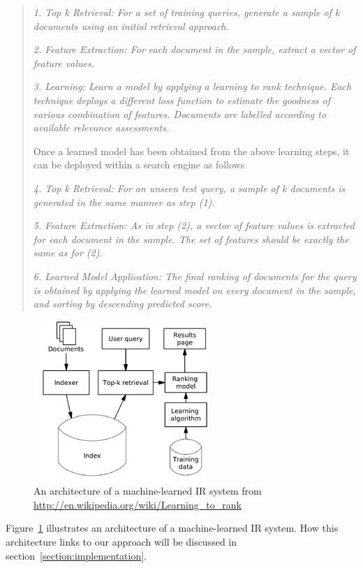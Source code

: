 \begin{quote}
  \item \textit{1. Top k Retrieval: For a set of training queries, generate a sample of k documents using an initial retrieval approach.}
  \item \textit{2. Feature Extraction: For each document in the sample, extract a vector of feature values.}
  \item \textit{3. Learning: Learn a model by applying a learning to rank technique. Each technique deploys a different loss function to estimate the goodness of
	various combination of features. Documents are labelled according to available relevance assessments.}

Once a learned model has been obtained from the above learning steps, it can be deployed within a search engine as follows~\cite[P. 4]{learningmodel}

 \item \textit{4. Top k Retrieval: For an unseen test query, a sample of k documents is generated in the same manner as step (1).}
 \item \textit{5. Feature Extraction: As in step (2), a vector of feature values is extracted for each document in the sample. The set of features should be exactly
	the same as for (2).}
 \item \textit{6. Learned Model Application: The final ranking of documents for the query is obtained by applying the learned model on every document in the sample,
	and sorting by descending predicted score.}
\end{quote}

\begin{figure}
\centering
\includegraphics[scale=0.7]{./figures/letor.png}
\caption{An architecture of a machine-learned IR system from \protect\url{http://en.wikipedia.org/wiki/Learning_to_rank}} \label{fig:letor} 
\end{figure}
Figure~\ref{fig:letor} illustrates an architecture of a machine-learned IR system. How this architecture links to our approach will be discussed in
section~\ref{section:implementation}.

